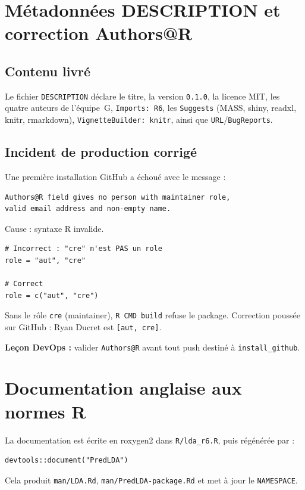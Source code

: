 \documentclass[11pt,a4paper]{article}
\begin{document}
\section{M\'etadonn\'ees DESCRIPTION et correction Authors@R}

\subsection{Contenu livr\'e}

Le fichier \texttt{DESCRIPTION} d\'eclare le titre, la version \texttt{0.1.0},
la licence MIT, les quatre auteurs de l'\'equipe~G, \texttt{Imports: R6}, les
\texttt{Suggests} (MASS, shiny, readxl, knitr, rmarkdown),
\texttt{VignetteBuilder: knitr}, ainsi que \texttt{URL}/\texttt{BugReports}.

\subsection{Incident de production corrig\'e}

Une premi\`ere installation GitHub a \'echou\'e avec le message :
\begin{lstlisting}
Authors@R field gives no person with maintainer role,
valid email address and non-empty name.
\end{lstlisting}
Cause : syntaxe R invalide.
\begin{lstlisting}
# Incorrect : "cre" n'est PAS un role
role = "aut", "cre"

# Correct
role = c("aut", "cre")
\end{lstlisting}
Sans le r\^ole \texttt{cre} (maintainer), \texttt{R CMD build} refuse le package.
Correction pouss\'ee sur GitHub : Ryan Ducret est \texttt{[aut, cre]}.

\textbf{Le\c{c}on DevOps :} valider \texttt{Authors@R} avant tout push destin\'e
\`a \texttt{install\_github}.

\section{Documentation anglaise aux normes R}

La documentation est \'ecrite en roxygen2 dans \texttt{R/lda\_r6.R}, puis
r\'eg\'en\'er\'ee par :
\begin{lstlisting}
devtools::document("PredLDA")
\end{lstlisting}
Cela produit \texttt{man/LDA.Rd}, \texttt{man/PredLDA-package.Rd} et met \`a jour
le \texttt{NAMESPACE}.
\end{document}
